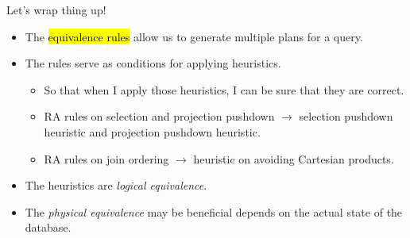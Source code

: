 \begin{frame}{Let's wrap thing up!}
  \begin{itemize}
    \item The \hl{equivalence rules} allow us to generate multiple plans for a query.
    \item The rules serve as conditions for applying heuristics. 
    \begin{itemize}
      \item So that when I apply those heuristics, I can be sure that they are correct.
      \item RA rules on selection and projection pushdown $\to$ selection pushdown heuristic and projection pushdown heuristic.
      \item RA rules on join ordering $\to$ heuristic on avoiding Cartesian products.
    \end{itemize}
    \item The heuristics are \textit{logical equivalence}. 
    \item The \textit{physical equivalence} may be beneficial depends on the actual state of the database.
  \end{itemize}

\end{frame}
